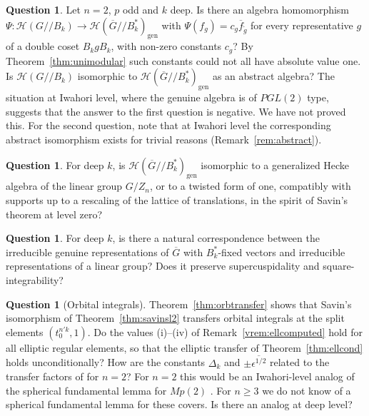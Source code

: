 \documentclass[12pt,letterpaper]{amsart}
\numberwithin{equation}{section}
\theoremstyle{definition}
\newtheorem{question}[theorem]{Question}
\theoremstyle{remark}
\newcommand{\cH}{\mathcal{H}}
\newcommand{\Gbar}{\overline{G}}
\newcommand{\gen}{\mathrm{gen}}
\newcommand{\fbar}{\overline{f}}
\newcommand{\Hgen}{\cH(\Gbar/\!/B_k^*)_{\gen}}
\newcommand{\Hlin}{\cH(G/\!/B_k)}
\begin{document}
\begin{question}
\label{q:n2}
Let $n=2$, $p$ odd and $k$ deep. Is there an algebra homomorphism
$\Psi:\Hlin\to\Hgen$ with $\Psi(f_g)=c_g\fbar_{\tilde g}$ for every
representative $g$ of a double coset $B_kgB_k$, with non-zero constants
$c_g$? By Theorem~\ref{thm:unimodular}
such constants could not all have absolute value one. Is $\Hlin$
isomorphic to $\Hgen$ as an abstract algebra? The situation at Iwahori
level, where the genuine algebra is of $PGL(2)$ type, suggests that the
answer to the first question is negative. We have not proved this. For
the second question, note that at Iwahori level the corresponding
abstract isomorphism exists for trivial reasons
(Remark~\ref{rem:abstract}).
\end{question}

\begin{question}
\label{q:savin}
For deep $k$, is $\Hgen$ isomorphic to a generalized Hecke algebra of
the linear group $G/Z_n$, or to a twisted form of one, compatibly with
supports up to a rescaling of the lattice of translations, in the
spirit of Savin's theorem at level zero?
\end{question}

\begin{question}
\label{q:reps}
For deep $k$, is there a natural correspondence between the
irreducible genuine representations of $\Gbar$ with $B_k^*$-fixed
vectors and irreducible representations of a linear group? Does it
preserve supercuspidality and square-integrability?
\end{question}

\begin{question}[Orbital integrals]
\label{q:transfer}
Theorem~\ref{thm:orbtransfer} shows that Savin's isomorphism of
Theorem~\ref{thm:savinsl2} transfers orbital integrals at the split
elements $(t_0^{n'k},1)$. Do the values (i)--(iv) of
Remark~\ref{vrem:ellcomputed} hold for all elliptic regular elements, so
that the elliptic transfer of Theorem~\ref{thm:ellcond} holds
unconditionally? How are the constants $\Delta_k$ and
$\pm\overline{\epsilon^{1/2}}$ related to the transfer factors of
\cite{Li11} for $n=2$? For
$n=2$ this would be an Iwahori-level analog of the spherical
fundamental lemma for $Mp(2)$ \cite{Li11,Lu18}. For $n\geq 3$ we do not
know of a spherical fundamental lemma for these covers. Is there an
analog at deep level?
\end{question}

\end{document}
